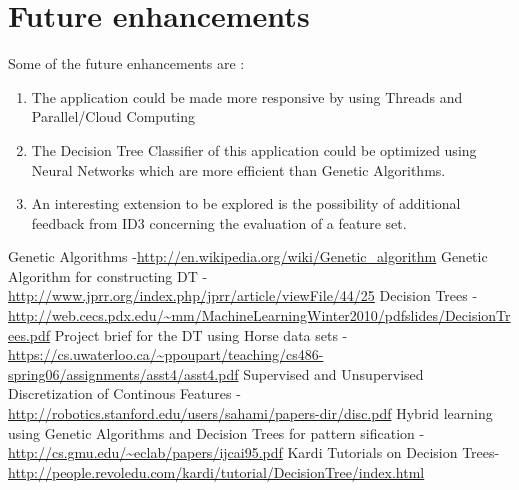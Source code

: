 \documentclass[12pt]{report}
\begin{document}
\section{Future enhancements}
Some of the future enhancements are :
\begin{enumerate}
\item{The application could be made more responsive by using Threads and Parallel/Cloud Computing}
\item{The Decision Tree Classifier of this application could be optimized using Neural Networks which are more efficient than Genetic Algorithms.}
\item{An interesting extension to be explored is the possibility of
additional feedback from ID3 concerning the evaluation of a
feature set.}
\end{enumerate}



\begin{thebibliography}{refs}
Genetic Algorithms  -\url{http://en.wikipedia.org/wiki/Genetic_algorithm}
Genetic Algorithm for constructing DT - \url{http://www.jprr.org/index.php/jprr/article/viewFile/44/25}
Decision Trees - \url{http://web.cecs.pdx.edu/~mm/MachineLearningWinter2010/pdfslides/DecisionTrees.pdf}
 Project brief for the DT  using Horse data sets  - \url{https://cs.uwaterloo.ca/~ppoupart/teaching/cs486-spring06/assignments/asst4/asst4.pdf}
Supervised and Unsupervised Discretization of Continous Features - \url{http://robotics.stanford.edu/users/sahami/papers-dir/disc.pdf}
Hybrid learning using Genetic Algorithms and Decision Trees for pattern sification - \url{http://cs.gmu.edu/~eclab/papers/ijcai95.pdf}
Kardi Tutorials on Decision Trees- \url{http://people.revoledu.com/kardi/tutorial/DecisionTree/index.html}

\end{thebibliography}

\newpage
\pagestyle{fancy}
\chead{}
\rfoot{\small{\thepage}}
\renewcommand{\headrulewidth}{0.4pt}
\renewcommand{\footrulewidth}{0.4pt}
\end{document}

